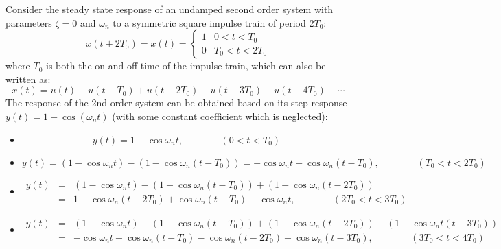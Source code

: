 \documentclass{article}
\begin{document}
Consider the steady state response of an undamped second order system with
parameters $\zeta=0$ and $\omega_n$ to a symmetric square impulse train of
period $2T_0$:
\begin{equation}
  x(t+2T_0)=x(t)=\left\{ \begin{array}{cl}1&0<t<T_0\\0&T_0<t<2T_0\end{array}\right.
\end{equation}
where $T_0$ is both the on and off-time of the impulse train, which can also
be written as:
\begin{equation}
  x(t)=u(t)-u(t-T_0)+u(t-2T_0)-u(t-3T_0)+u(t-4T_0)- \cdots 
\end{equation}
The response of the 2nd order system can be obtained based on its step
response $y(t)=1-\cos(\omega_nt)$ (with some constant coefficient which 
is neglected):
\begin{itemize}
\item
  \begin{equation}
    y(t)=1-\cos\omega_nt,\;\;\;\;\;\;\;\;\;\;\;\;\;\;(0<t<T_0) 
  \end{equation}
\item 
  \begin{equation}
    y(t)=(1-\cos\omega_nt)-(1-\cos\omega_n(t-T_0))
    =-\cos\omega_nt+\cos\omega_n(t-T_0),\;\;\;\;\;\;\;\;\;\;\;\;\;\;(T_0<t<2T_0) 
  \end{equation}
\item
  \begin{eqnarray}
    y(t)&=&(1-\cos\omega_nt)-(1-\cos\omega_n(t-T_0))+(1-\cos\omega_n(t-2T_0))
    \nonumber \\
    &=&1-\cos\omega_n(t-2T_0)+\cos\omega_n(t-T_0)-\cos\omega_nt,
    \;\;\;\;\;\;\;\;\;\;\;\;\;\;(2T_0<t<3T_0)
  \end{eqnarray}
\item 
  \begin{eqnarray} 
    y(t)&=&(1-\cos\omega_nt)-(1-\cos\omega_n(t-T_0))+(1-\cos\omega_n(t-2T_0))
    -(1-\cos\omega_nt(t-3T_0))
    \nonumber \\
    &=&-\cos\omega_nt+\cos\omega_n(t-T_0)-\cos\omega_n(t-2T_0)+\cos\omega_n(t-3T_0),
    \;\;\;\;\;\;\;\;\;\;\;\;\;\;(3T_0<t<4T_0)
  \end{eqnarray}
\end{itemize}
\end{document}
